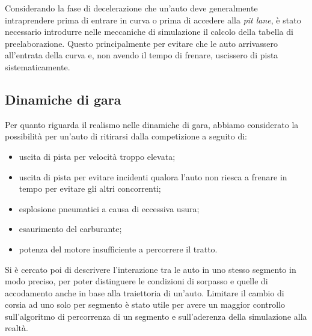 Considerando la fase di decelerazione che un'auto deve generalmente intraprendere prima di entrare in curva o prima di accedere alla \textit{pit lane}, è stato necessario introdurre nelle meccaniche di simulazione il calcolo della tabella di preelaborazione. Questo principalmente per evitare che le auto arrivassero all'entrata della curva e, non avendo il tempo di frenare, uscissero di pista sistematicamente.

\subsection*{Dinamiche di gara}
Per quanto riguarda il realismo nelle dinamiche di gara, abbiamo considerato la possibilità per un'auto di ritirarsi dalla competizione a seguito di:
\begin{itemize}
\item uscita di pista per velocità troppo elevata;
\item uscita di pista per evitare incidenti qualora l'auto non riesca a frenare in tempo per evitare gli altri concorrenti;
\item esplosione pneumatici a causa di eccessiva usura;
\item esaurimento del carburante;
\item potenza del motore insufficiente a percorrere il tratto.
\end{itemize}

Si è cercato poi di descrivere l'interazione tra le auto in uno stesso segmento in modo preciso, per poter distinguere le condizioni di sorpasso e quelle di accodamento anche in base alla traiettoria di un'auto. Limitare il cambio di corsia ad uno solo per segmento è stato utile per avere un maggior controllo sull'algoritmo di percorrenza di un segmento e sull'aderenza della simulazione alla realtà.
